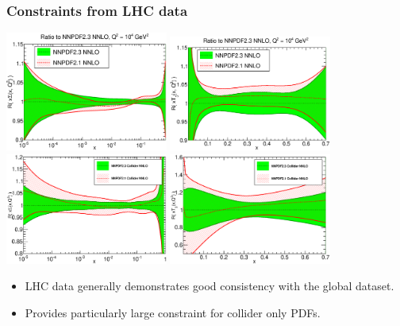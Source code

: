 \documentclass[10pt]{beamer}
\begin{document}
\begin{frame}
\frametitle{Constraints from LHC data}
\begin{center}
   \includegraphics[width=0.4\textwidth]{xSinglet_Q_10000_log-rat-21-vs-23-nnlo.eps}
 \includegraphics[width=0.4\textwidth]{xT3_Q_10000_lin-rat-21-vs-23-nnlo.eps}\\
     \includegraphics[width=0.4\textwidth]{colliderSigma.eps}
 \includegraphics[width=0.4\textwidth]{colliderT3.eps}
 \end{center}
 \begin{itemize}
 \item<1-> LHC data generally demonstrates good consistency with the global dataset.
  \item<1-> Provides particularly large constraint for collider only PDFs.

 \end{itemize}
 \end{frame}
\end{document}
